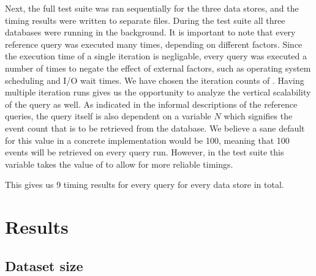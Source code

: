 Next, the full test suite was ran sequentially for the three data stores, and the timing results were written to separate files.
During the test suite all three databases were running in the background.
It is important to note that every reference query was executed many times, depending on different factors.
Since the execution time of a single iteration is negligable, every query was executed a number of times to negate the effect of external factors, such as operating system scheduling and I/O wait times.
We have chosen the iteration counts of .
Having multiple iteration runs gives us the opportunity to analyze the vertical scalability of the query as well.
As indicated in the informal descriptions of the reference queries, the query itself is also dependent on a variable $N$ which signifies the event count that is to be retrieved from the database.
We believe a sane default for this value in a concrete implementation would be 100, meaning that 100 events will be retrieved on every query run.
However, in the test suite this variable takes the value of  to allow for more reliable timings.

This gives us 9 timing results for every query for every data store in total.

\section{Results}
\label{sec:results}






\subsection{Dataset size}

